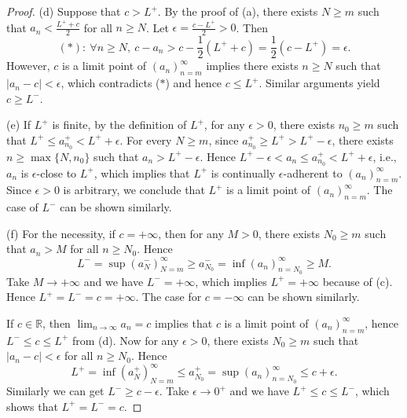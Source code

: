 \begin{proof}
  (d) Suppose that $c>L^{+}$. By the proof of (a),
  there exists $N\ge m$ such that $a_{n}<\frac{L^{+}+c}{2}$
  for all $n\ge N$. Let $\epsilon=\frac{c-L^{+}}{2}>0$.
  Then
  \begin{displaymath}
    (\ast):\ \forall n\ge N,\ 
    c-a_{n}>c-\frac{1}{2}(L^{+}+c)=\frac{1}{2}(c-L^{+})=\epsilon.
  \end{displaymath}
  However, $c$ is a limit point of $(a_{n})_{n=m}^{\infty}$ implies
  there exists $n\ge N$ such that $|a_{n}-c|<\epsilon$,
  which contradicts ($\ast$) and hence $c\le L^{+}$.
  Similar arguments yield $c\ge L^{-}$.

  (e) If $L^{+}$ is finite, by the definition of $L^{+}$,
  for any $\epsilon>0$, there exists $n_{0}\ge m$ such that
  $L^{+} \le a_{n_{0}}^{+}<L^{+}+\epsilon$.
  For every $N\ge m$, 
  since $a_{n_{0}}^{+}\ge L^{+}>L^{+}-\epsilon$,
  there exists $n\ge \max\{N,n_{0}\}$ such that $a_{n}>L^{+}-\epsilon.$
  Hence $L^{+}-\epsilon<a_{n}\le a_{n_{0}}^{+}<L^{+}+\epsilon$, i.e.,
  $a_{n}$ is $\epsilon$-close to $L^{+}$, which implies that
  $L^{+}$ is continually $\epsilon$-adherent to
  $(a_{n})_{n=m}^{\infty}$.
  Since $\epsilon>0$ is arbitrary, we conclude that 
  $L^{+}$ is a limit point of $(a_{n})_{n=m}^{\infty}$.
  The case of $L^{-}$ can be shown similarly.

  (f) For the necessity,
  if $c=+\infty$, then for any $M>0$,
  there exists $N_{0}\ge m$ such that
  $a_{n}>M$ for all $n\ge N_{0}$. Hence
  \begin{displaymath}
    L^{-}=\sup(a_{N}^{-})_{N=m}^{\infty}
    \ge a_{N_{0}}^{-}
    =\inf(a_{n})_{n=N_{0}}^{\infty}
    \ge M.
  \end{displaymath}
  Take $M\rightarrow +\infty$ and we have $L^{-}=+\infty$,
  which implies $L^{+}=+\infty$ because of (c).
  Hence $L^{+}=L^{-}=c=+\infty.$
  The case for $c=-\infty$ can be shown similarly.

  If $c\in \mathbb{R}$, then
  $\lim_{n\rightarrow \infty}a_{n}=c$ implies that
  $c$ is a limit point of $(a_{n})_{n=m}^{\infty}$, hence
  $L^{-}\le c\le L^{+}$ from (d).
  Now for any $\epsilon>0$, there exists $N_{0}\ge m$ such that
  $|a_{n}-c|<\epsilon$ for all $n\ge N_{0}$. Hence
  \begin{displaymath}
    L^{+}=\inf(a_{N}^{+})_{N=m}^{\infty}
    \le a_{N_{0}}^{+}
    =\sup(a_{n})_{n=N_{0}}^{\infty}\le c+\epsilon.
  \end{displaymath}
  Similarly we can get $L^{-}\ge c-\epsilon$.
  Take $\epsilon\rightarrow 0^{+}$ and we have $L^{+}\le c\le L^{-}$,
  which shows that $L^{+}=L^{-}=c$.


\end{proof}
